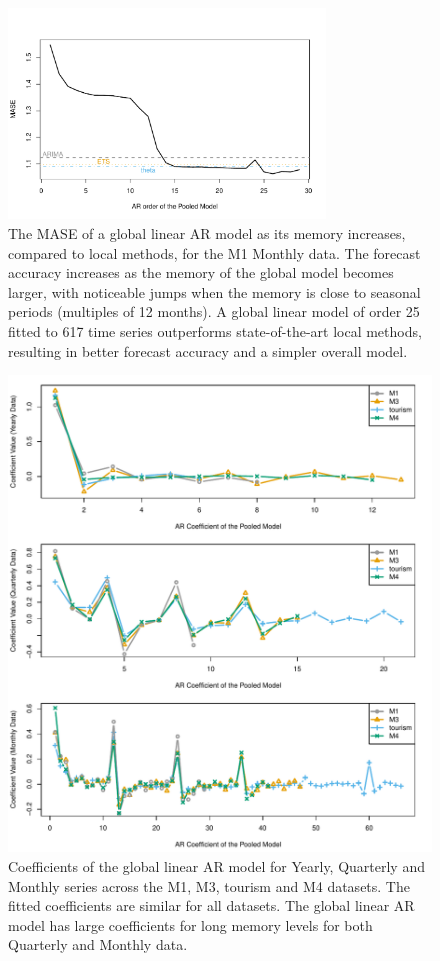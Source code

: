 \documentclass[a4paper]{article}
\theoremstyle{custom}
\begin{document}
\begin{figure}[!htb]
  \centering
  \includegraphics[width=0.75\textwidth]{fig/M1MonthlyMem.pdf}
  \caption{The MASE of a global linear AR model as its memory increases, compared to local methods, for the M1 Monthly data. The forecast accuracy increases as the memory of the global model becomes larger, with noticeable jumps when the memory is close to seasonal periods (multiples of 12 months). A global linear model of order 25 fitted to 617 time series outperforms state-of-the-art local methods, resulting in better forecast accuracy and a simpler overall model.}
  \label{fig:outsampleM1}
\end{figure}

\begin{figure}[!p]
  \centering
  \includegraphics[width=1.0\textwidth]{fig/ARcoef.pdf}
  \caption{Coefficients of the global linear AR model for Yearly, Quarterly and Monthly series across the M1, M3, tourism and M4 datasets. The fitted coefficients are similar for all datasets. The global linear AR model has large coefficients for long memory levels for both Quarterly and Monthly data.}
  \label{fig:ARcoef}
\end{figure}
\end{document}
